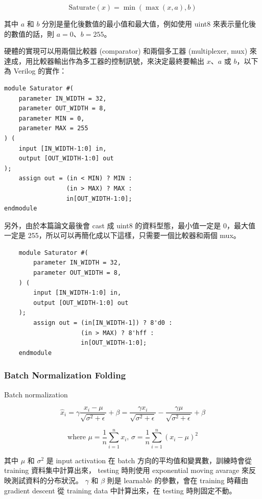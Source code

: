 \documentclass[12pt]{article}
\begin{document}
$$
\text{Saturate}(x) = \min(\max(x, a), b)
$$

其中 $a$ 和 $b$ 分別是量化後數值的最小值和最大值，例如使用 uint8 來表示量化後的數值的話，則 $a=0$、$b=255$。

硬體的實現可以用兩個比較器 (comparator) 和兩個多工器 (multiplexer, mux) 來達成，用比較器輸出作為多工器的控制訊號，來決定最終要輸出 $x$、$a$ 或 $b$，以下為 Verilog 的實作：

\begin{verbatim}
module Saturator #(
    parameter IN_WIDTH = 32,
    parameter OUT_WIDTH = 8,
    parameter MIN = 0,
    parameter MAX = 255
) (
    input [IN_WIDTH-1:0] in,
    output [OUT_WIDTH-1:0] out
);
    assign out = (in < MIN) ? MIN :
                 (in > MAX) ? MAX :
                 in[OUT_WIDTH-1:0];
endmodule
\end{verbatim}

另外，由於本篇論文最後會 cast 成 uint8 的資料型態，最小值一定是 0，最大值一定是 255，所以可以再簡化成以下這樣，只需要一個比較器和兩個 mux。

\begin{verbatim}
    module Saturator #(
        parameter IN_WIDTH = 32,
        parameter OUT_WIDTH = 8,
    ) (
        input [IN_WIDTH-1:0] in,
        output [OUT_WIDTH-1:0] out
    );
        assign out = (in[IN_WIDTH-1]) ? 8'd0 :
                     (in > MAX) ? 8'hff :
                     in[OUT_WIDTH-1:0];
    endmodule
    \end{verbatim}

\subsubsection{Batch Normalization Folding}

Batch normalization

$$
\hat x_i = \gamma \frac{x_i - \mu}{\sqrt{\sigma^2 + \epsilon}} + \beta
= \frac{\gamma x_i}{\sqrt{\sigma^2 + \epsilon}} - \frac{\gamma \mu}{\sqrt{\sigma^2 + \epsilon}} + \beta
$$

$$
\text{where } \mu = \frac{1}{n}\sum_{i=1}^{n}x_i
\text{, }
\sigma = \frac{1}{n} \sum_{i=1}^{n} (x_i - \mu)^2
$$

其中 $\mu$ 和 $\sigma^2$ 是 input activation 在 batch 方向的平均值和變異數，訓練時會從 training 資料集中計算出來， testing 時則使用 exponential moving avarage 來反映測試資料的分布狀況。
$\gamma$ 和 $\beta$ 則是 learnable 的參數，會在 training 時藉由 gradient descent 從 training data 中計算出來，在 testing 時則固定不動。
\end{document}
